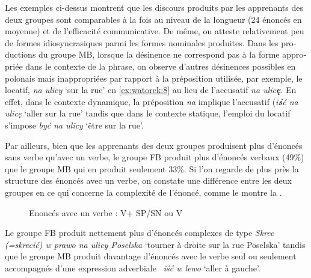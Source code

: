\documentclass[output=paper]{langscibook}
\begin{document}
\begin{otherlanguage}{french}
Les exemples ci-dessus montrent que les discours produits par les apprenants des deux groupes sont comparables à la fois au niveau de la longueur (24 énoncés en moyenne) et de l’efficacité communicative. De même, on atteste relativement peu de formes idiosyncrasiques parmi les formes nominales produites. Dans les productions du groupe MB, lorsque la désinence ne correspond pas à la forme appropriée dans le contexte de la phrase, on observe d’autres désinences possibles en polonais mais inappropriées par rapport à la préposition utilisée, par exemple, le locatif, \textit{na ulicy} `sur la rue' en \ref{ex:watorek:8} au lieu de l’accusatif \textit{na ulic\textbf{ę}}. En effet, dans le contexte dynamique, la préposition \textit{na} implique l’accusatif (\textit{i}\textbf{\textit{ś}}\textit{ć na ulicę} `aller sur la rue' tandis que dans le contexte statique, l’emploi du locatif s’impose \textit{być na ulicy} `être sur la rue'. 

Par ailleurs, bien que les apprenants des deux groupes produisent plus d’énoncés sans verbe qu’avec un verbe, le groupe FB produit plus d’énoncés verbaux (49\%) que le groupe MB qui en produit seulement 33\%. Si l’on regarde de plus près la structure des énoncés avec un verbe, on constate une différence entre les deux groupes en ce qui concerne la complexité de l’énoncé, comme le montre la .

\begin{figure}
\caption{Enoncés avec un verbe : V+ SP/SN ou V}
\label{fig:watorek:6}
\end{figure}

Le groupe FB produit nettement plus d’énoncés complexes de type \textit{Skrec (=skrecić) w prawo na ulicy Poselska} `tourner à droite sur la rue Poselska' tandis que le groupe MB produit davantage d’énoncés avec le verbe seul ou seulement accompagnés d'une expression adverbiale \textit{~iść w lewo} `aller à gauche'.


\end{otherlanguage}
\end{document}
